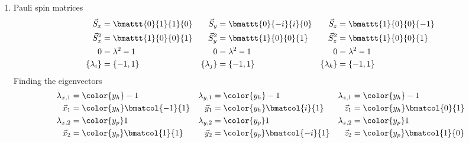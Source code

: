 \begin{enumerate}
    \item Pauli spin matrices
          \begin{align}
              \vec{S}_x     & = \bmattt{0}{1}{1}{0}  &
              \vec{S}_y     & = \bmattt{0}{-i}{i}{0} &
              \vec{S}_z     & = \bmattt{1}{0}{0}{-1}   \\
              \vec{S}_x^2   & = \bmattt{1}{0}{0}{1}  &
              \vec{S}_y^2   & = \bmattt{1}{0}{0}{1}  &
              \vec{S}_z^2   & = \bmattt{1}{0}{0}{1}    \\
              0             & = \lambda^2 - 1        &
              0             & = \lambda^2 - 1        &
              0             & = \lambda^2 - 1          \\
              \{\lambda_i\} & = \{-1, 1\}            &
              \{\lambda_j\} & = \{-1, 1\}            &
              \{\lambda_k\} & = \{-1, 1\}
          \end{align}
          Finding the eigenvectors
          \begin{align}
              \lambda_{x,1} & = \color{y_h} -1              &
              \lambda_{y,1} & = \color{y_h} -1              &
              \lambda_{z,1} & = \color{y_h} -1                \\
              \vec{x}_1     & = \color{y_h} \bmatcol{-1}{1} &
              \vec{y}_1     & = \color{y_h} \bmatcol{i}{1}  &
              \vec{z}_1     & = \color{y_h} \bmatcol{0}{1}    \\
              \lambda_{x,2} & = \color{y_p} 1               &
              \lambda_{y,2} & = \color{y_p} 1               &
              \lambda_{z,2} & = \color{y_p} 1                 \\
              \vec{x}_2     & = \color{y_p} \bmatcol{1}{1}  &
              \vec{y}_2     & = \color{y_p} \bmatcol{-i}{1} &
              \vec{z}_2     & = \color{y_p} \bmatcol{1}{0}
          \end{align}


\end{enumerate}
